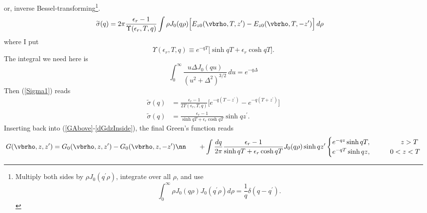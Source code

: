 \documentclass[letterpaper]{article}
\renewcommand{\wt}{\widetilde}
\begin{document}
or, inverse Bessel-transforming\footnote{Multiply both 
sides by $\rho J_0(q^\prime\rho)$, integrate over all $\rho$, and
use 
$$\int_0^\infty \rho J_0(q\rho) J_0(q^\prime \rho) d\rho = 
  \frac{1}{q}\delta(q-q^\prime).$$}.
\begin{align}
\wt \sigma(q)
&=2\pi \frac{\epsilon_r-1}{\Upsilon(\epsilon_r, T, q)}
  \int \rho J_0(q\rho)
  \Big[   E_{z0}(\vbrho, T, z^\prime)
        - E_{z0}(\vbrho, T, -z^\prime)
  \Big] \, d\rho 
\label{Sigma1}
\end{align}
where I put
$$ \Upsilon(\epsilon_r, T, q) \equiv
   e^{-qT}\Big[\sinh qT + \epsilon_r \cosh qT\Big].
$$
The integral we need here is
$$ \int_0^\infty \frac{ u \Delta  J_0(qu)}{(u^2 + \Delta^2)^{3/2}}\,du
   =e^{-q\Delta}
$$
Then (\ref{Sigma1}) reads
\begin{align*}
 \wt{\sigma}(q)
 &=\frac{\epsilon_r-1}{2\Upsilon(\epsilon_r,T,q)}
   \Big[ e^{-q(T-z^\prime)} - e^{-q(T+z^\prime)}\Big]
\\
 \wt{\sigma}(q)
 &=\frac{\epsilon_r-1}{\sinh qT + \epsilon_r \cosh qT}
   \sinh qz^\prime.
\end{align*}
Inserting back into (\ref{GAbove}-\ref{dGdzInside}), the final 
Green's function reads
\begin{align}
 G(\vbrho, z, z^\prime)
  &= G_0(\vbrho, z, z^\prime) - G_0(\vbrho, z, -z^\prime)
\nn
&\quad 
    +\int \frac{dq}{2\pi} 
          \frac{\epsilon_r-1}{\sinh qT + \epsilon_r \cosh qT} J_0(q\rho)
          \sinh qz^\prime
          \begin{cases}
            e^{-qz} \sinh qT, \qquad &\hphantom{0<}z>T \\
            e^{-qT} \sinh qz, \qquad &0<z<T
          \end{cases}
\nonumber
\end{align}
\end{document}
